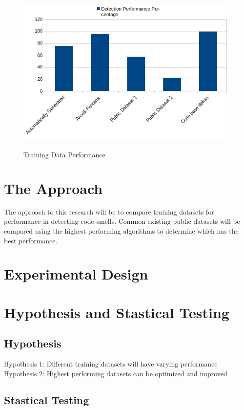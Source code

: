 \documentclass[conference]{IEEEtran}
\begin{document}
\begin{figure}[ht]{
  \includegraphics[width=\columnwidth]{teaser.png}}
  \caption{Training Data Performance}
  \label{fig:ts}
\end{figure} 

\section{The Approach}
The approach to this research will be to compare training datasets for performance in detecting code smells.
Common existing public datasets will be compared using the highest performing algorithms to determine which has the best performance.

\section{Experimental Design}

\section{Hypothesis and Stastical Testing}
\subsection{Hypothesis}
Hypothesis 1: Different training datasets will have varying performance
Hypothesis 2: Highest performing datasets can be optimized and improved
\subsection{Stastical Testing}
\end{document}
